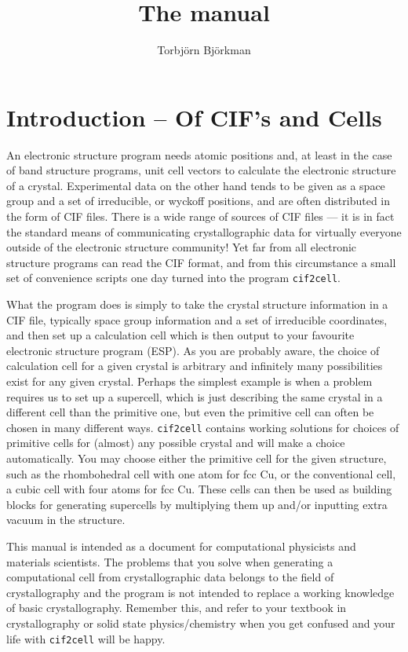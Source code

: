 \documentclass[11pt]{article}
\title{The \ciftocell{} manual}
\author{Torbj\"orn Bj\"orkman}
\newcommand{\ciftocell}{\texttt{cif2cell}}
\begin{document}
\maketitle
\tableofcontents
\newpage
\section*{Introduction -- Of CIF's and Cells}
An electronic structure program needs atomic positions and, at least in the case of band structure programs, unit cell vectors to calculate the electronic structure of a crystal. Experimental data on the other hand tends to be given as a space group and a set of irreducible, or wyckoff positions, and are often distributed in the form of CIF files. There is a wide range of sources of CIF files --- it is in fact the standard means of communicating crystallographic data for virtually everyone outside of the electronic structure community! Yet far from all electronic structure programs can read the CIF format, and from this circumstance a small set of convenience scripts one day turned into the program \ciftocell.

What the program does is simply to take the crystal structure information in a CIF file, typically space group information and a set of irreducible coordinates, and then set up a calculation cell which is then output to your favourite electronic structure program (ESP). As you are probably aware, the choice of calculation cell for a given crystal is arbitrary and infinitely many possibilities exist for any given crystal. Perhaps the simplest example is when a problem requires us to set up a supercell, which is just describing the same crystal in a different cell than the primitive one, but even the primitive cell can often be chosen in many different ways. \ciftocell{} contains working solutions for choices of primitive cells for (almost) any possible crystal and will make a choice automatically. You may choose either the primitive cell for the given structure, such as the rhombohedral cell with one atom for fcc Cu, or the conventional cell, a cubic cell with four atoms for fcc Cu. These cells can then be used as building blocks for generating supercells by multiplying them up and/or inputting extra vacuum in the structure. 

This manual is intended as a document for computational physicists and materials scientists. The problems that you solve when generating a computational cell from crystallographic data belongs to the field of crystallography and the program is not intended to replace a working knowledge of basic crystallography. Remember this, and refer to your textbook in crystallography or solid state physics/chemistry when you get confused and your life with \ciftocell{} will be happy.
\end{document}
